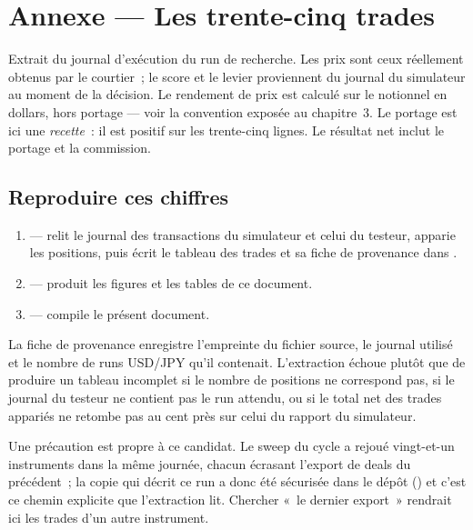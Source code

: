 \clearpage
\section*{Annexe --- Les trente-cinq trades}

Extrait du journal d'exécution du run de recherche. Les prix sont ceux
réellement obtenus par le courtier~; le score et le levier proviennent du
journal du simulateur au moment de la décision. Le rendement de prix est
calculé sur le notionnel en dollars, hors portage --- voir la convention
exposée au chapitre~3. Le portage est ici une \emph{recette}~: il est positif
sur les trente-cinq lignes. Le résultat net inclut le portage et la commission.

\medskip

{\footnotesize

}

\bigskip

\subsection*{Reproduire ces chiffres}

\begin{enumerate}[leftmargin=1.4em, itemsep=0.3em]
\item {} --- relit le
      journal des transactions du simulateur et celui du testeur, apparie les
      positions, puis écrit le tableau des trades et sa fiche de provenance
      dans .
\item {} --- produit les
      figures et les tables de ce document.
\item {} --- compile le
      présent document.
\end{enumerate}

La fiche de provenance 
enregistre l'empreinte du fichier source, le journal utilisé et le nombre de
runs USD/JPY qu'il contenait. L'extraction échoue plutôt que de produire un
tableau incomplet si le nombre de positions ne correspond pas, si le journal du
testeur ne contient pas le run attendu, ou si le total net des trades appariés
ne retombe pas au cent près sur celui du rapport du simulateur.

\medskip

Une précaution est propre à ce candidat. Le sweep du cycle a rejoué
vingt-et-un instruments dans la même journée, chacun écrasant l'export de deals
du précédent~; la copie qui décrit ce run a donc été sécurisée dans le dépôt
() et c'est ce chemin explicite que
l'extraction lit. Chercher «~le dernier export~» rendrait ici les trades d'un
autre instrument.
